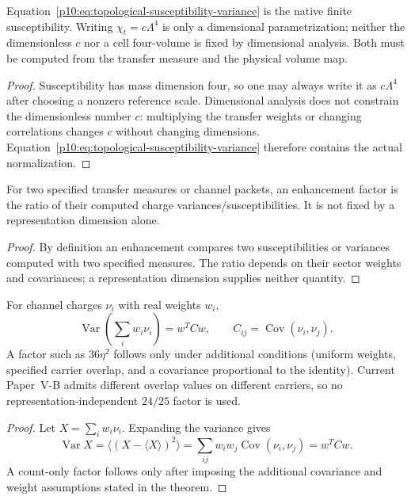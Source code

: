 \documentclass[12pt,a4paper]{article}
\begin{document}
\begin{theorem}
\label{p10:thm:minimal-native-topological-susceptibility}
Equation~\eqref{p10:eq:topological-susceptibility-variance} is the native finite susceptibility.  Writing \(\chi_t=c\Lambda^4\) is only a dimensional parametrization; neither the dimensionless \(c\) nor a cell four-volume is fixed by dimensional analysis.  Both must be computed from the transfer measure and the physical volume map.
\end{theorem}
\begin{proof}
Susceptibility has mass dimension four, so one may always write it as $c\Lambda^4$ after choosing a nonzero reference scale.  Dimensional analysis does not constrain the dimensionless number $c$: multiplying the transfer weights or changing correlations changes $c$ without changing dimensions.  Equation~\eqref{p10:eq:topological-susceptibility-variance} therefore contains the actual normalization.
\end{proof}

\begin{corollary}
\label{p10:cor:topological-enhancement-readout}
For two specified transfer measures or channel packets, an enhancement factor is the ratio of their computed charge variances/susceptibilities.  It is not fixed by a representation dimension alone.
\end{corollary}
\begin{proof}
By definition an enhancement compares two susceptibilities or variances computed with two specified measures.  The ratio depends on their sector weights and covariances; a representation dimension supplies neither quantity.
\end{proof}

\begin{theorem}
\label{p10:thm:orthogonal-hurwitz-adjoint-winding-variance}
For channel charges \(\nu_i\) with real weights \(w_i\),
\begin{equation}
\label{p10:eq:mixed-shell-topological-covariance}
\operatorname{Var}\!\left(\sum_iw_i\nu_i\right)=w^TCw,
\qquad C_{ij}=\operatorname{Cov}(\nu_i,\nu_j).
\end{equation}
A factor such as \(36\eta^2\) follows only under additional conditions (uniform weights, specified carrier overlap, and a covariance proportional to the identity).  Current Paper~V-B admits different overlap values on different carriers, so no representation-independent \(24/25\) factor is used.
\end{theorem}
\begin{proof}
Let $X=\sum_iw_i\nu_i$. Expanding the variance gives
\[
\operatorname{Var}X
=\langle(X-\langle X\rangle)^2\rangle
=\sum_{ij}w_iw_j\operatorname{Cov}(\nu_i,\nu_j)
=w^TCw.
\]
A count-only factor follows only after imposing the additional covariance
and weight assumptions stated in the theorem.
\end{proof}
\end{document}
